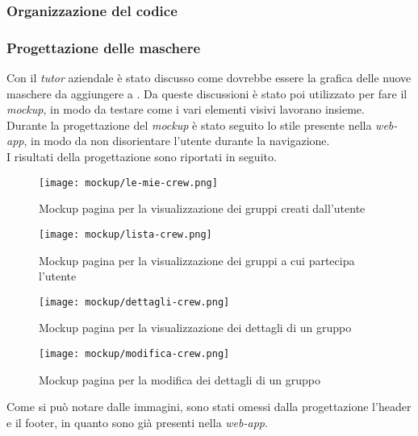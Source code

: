 \subsubsection{Organizzazione del codice}
\subsubsection{Progettazione delle maschere}
Con il \textit{tutor} aziendale è stato discusso come dovrebbe essere la grafica delle nuove maschere da aggiungere a \productName. Da queste discussioni è stato poi utilizzato  per fare il \textit{mockup}, in modo da  testare come i vari elementi visivi lavorano insieme.\\
Durante la progettazione del \textit{mockup} è stato seguito lo stile presente nella \textit{web-app}, in modo da non disorientare l'utente durante la navigazione. \\
I risultati della progettazione sono riportati in seguito.
\begin{figure}[H] 
    \centering 
    \texttt{[image: mockup/le-mie-crew.png]} 
    \caption{Mockup pagina per la visualizzazione dei gruppi creati dall'utente}
\end{figure}

\begin{figure}[H] 
    \centering 
    \texttt{[image: mockup/lista-crew.png]} 
    \caption{Mockup pagina per la visualizzazione dei gruppi a cui partecipa l'utente}
\end{figure}

\begin{figure}[H] 
    \centering 
    \texttt{[image: mockup/dettagli-crew.png]} 
    \caption{Mockup pagina per la visualizzazione dei dettagli di un gruppo}
\end{figure}

\begin{figure}[H] 
    \centering 
    \texttt{[image: mockup/modifica-crew.png]} 
    \caption{Mockup pagina per la modifica dei dettagli di un gruppo}
\end{figure}

Come si può notare dalle immagini, sono stati omessi dalla progettazione l'header e il footer, in quanto sono già presenti nella \textit{web-app}.



